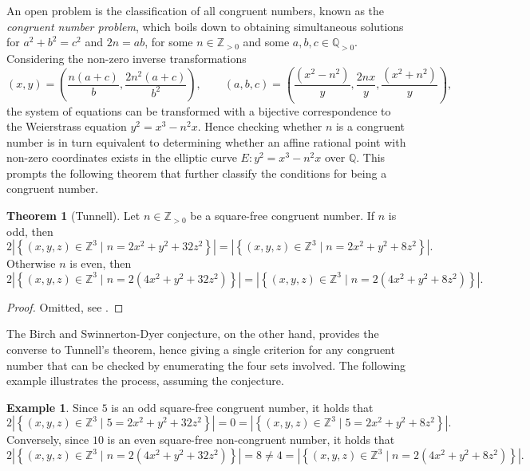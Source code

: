 \documentclass{article}
\newcommand{\Z}{\mathbb{Z}}
\newcommand{\Q}{\mathbb{Q}}
\newcommand{\rb}[1]{\left( #1 \right)}
\newcommand{\cb}[1]{\left\{ #1 \right\}}
\newcommand{\abs}[1]{\left\lvert #1 \right\rvert}
\theoremstyle{definition}
\newtheorem*{example}{Example}
\newtheorem{theorem}[proposition]{Theorem}
\begin{document}
An open problem is the classification of all congruent numbers, known as the \emph{congruent number problem}, which boils down to obtaining simultaneous solutions for $ a^2 + b^2 = c^2 $ and $ 2n = ab $, for some $ n \in \Z_{> 0} $ and some $ a, b, c \in \Q_{> 0} $. Considering the non-zero inverse transformations
$$ \rb{x, y} = \rb{\dfrac{n\rb{a + c}}{b}, \dfrac{2n^2\rb{a + c}}{b^2}}, \qquad \rb{a, b, c} = \rb{\dfrac{\rb{x^2 - n^2}}{y}, \dfrac{2nx}{y}, \dfrac{\rb{x^2 + n^2}}{y}}, $$
the system of equations can be transformed with a bijective correspondence to the Weierstrass equation $ y^2 = x^3 - n^2x $. Hence checking whether $ n $ is a congruent number is in turn equivalent to determining whether an affine rational point with non-zero coordinates exists in the elliptic curve $ E : y^2 = x^3 - n^2x $ over $ \Q $. This prompts the following theorem that further classify the conditions for being a congruent number.

\begin{theorem}[Tunnell]
Let $ n \in \Z_{> 0} $ be a square-free congruent number. If $ n $ is odd, then
$$ 2\abs{\cb{\rb{x, y, z} \in \Z^3 \mid n = 2x^2 + y^2 + 32z^2}} = \abs{\cb{\rb{x, y, z} \in \Z^3 \mid n = 2x^2 + y^2 + 8z^2}}. $$
Otherwise $ n $ is even, then
$$ 2\abs{\cb{\rb{x, y, z} \in \Z^3 \mid n = 2\rb{4x^2 + y^2 + 32z^2}}} = \abs{\cb{\rb{x, y, z} \in \Z^3 \mid n = 2\rb{4x^2 + y^2 + 8z^2}}}. $$
\end{theorem}

\begin{proof}
Omitted, see \cite{tunnell}.
\end{proof}

The Birch and Swinnerton-Dyer conjecture, on the other hand, provides the converse to Tunnell's theorem, hence giving a single criterion for any congruent number that can be checked by enumerating the four sets involved. The following example illustrates the process, assuming the conjecture.

\begin{example}
Since $ 5 $ is an odd square-free congruent number, it holds that
$$ 2\abs{\cb{\rb{x, y, z} \in \Z^3 \mid 5 = 2x^2 + y^2 + 32z^2}} = 0 = \abs{\cb{\rb{x, y, z} \in \Z^3 \mid 5 = 2x^2 + y^2 + 8z^2}}. $$
Conversely, since $ 10 $ is an even square-free non-congruent number, it holds that
$$ 2\abs{\cb{\rb{x, y, z} \in \Z^3 \mid n = 2\rb{4x^2 + y^2 + 32z^2}}} = 8 \ne 4 = \abs{\cb{\rb{x, y, z} \in \Z^3 \mid n = 2\rb{4x^2 + y^2 + 8z^2}}}. $$
\end{example}
\end{document}
